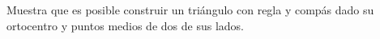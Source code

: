 Muestra que es posible construir un triángulo con regla y compás dado su ortocentro y puntos medios de dos de sus lados.